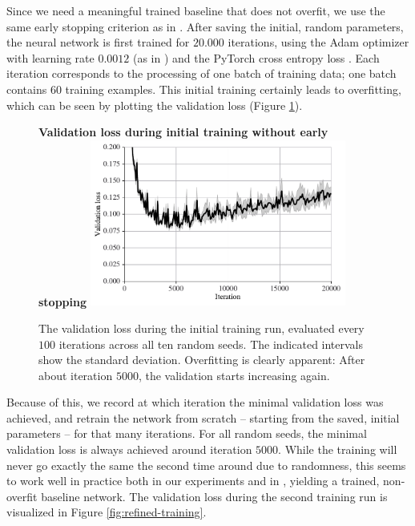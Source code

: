 \documentclass[12pt,final,twoside]{article}
\theoremstyle{plain}
\theoremstyle{definition}
\theoremstyle{remark}
\theoremstyle{named}
\begin{document}
Since we need a meaningful trained baseline that does not overfit, we use the same early stopping criterion as in \cite{supermask}. After saving the initial, random parameters, the neural network is first trained for $20.000$ iterations, using the Adam optimizer \cite{adam} with learning rate $0.0012$ (as in \cite{supermask}) and the PyTorch cross entropy loss \cite{pytorch}. Each iteration corresponds to the processing of one batch of training data; one batch contains $60$ training examples. This initial training certainly leads to overfitting, which can be seen by plotting the validation loss (Figure \ref{fig:initial-training}).

\begin{figure}[t!]
  \centering
  \textbf{Validation loss during initial training without early stopping}
  \includegraphics[width=0.75\textwidth]{plots/initial_trainings.pdf}
  \caption{The validation loss during the initial training run, evaluated every $100$ iterations across all ten random seeds. The indicated intervals show the standard deviation. Overfitting is clearly apparent: After about iteration $5000$, the validation starts increasing again.}
  \label{fig:initial-training}
\end{figure}

Because of this, we record at which iteration the minimal validation loss was achieved, and retrain the network from scratch -- starting from the saved, initial parameters -- for that many iterations. For all random seeds, the minimal validation loss is always achieved around iteration $5000$. While the training will never go exactly the same the second time around due to randomness, this seems to work well in practice both in our experiments and in \cite{supermask}, yielding a trained, non-overfit baseline network. The validation loss during the second training run is visualized in Figure \ref{fig:refined-training}.
\end{document}
